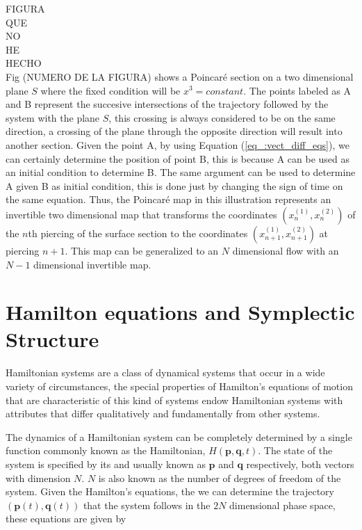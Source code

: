 FIGURA\\
QUE\\
NO\\
HE\\
HECHO\\

Fig (NUMERO DE LA FIGURA) shows a Poincaré section on a two dimensional plane $S$ where the fixed condition will be $x^{3}=constant$. The points labeled as A and B represent the succesive intersections of the trajectory followed by the system with the plane $S$, this crossing is always considered to be on the same direction, a crossing of the plane through the opposite direction will result into another section. Given the point A, by using Equation (\ref{eq_:vect_diff_eqs}), we can certainly determine the position of point B, this is because A can be used as an initial condition to determine B. The same argument can be used to determine A given B as initial condition, this is done just by changing the sign of time on the same equation. Thus, the Poincar\'e map in this illustration represents an invertible two dimensional map that transforms the coordinates $(x_n^{(1)},x_n^{(2)})$ of the $n$th piercing of the surface section to the coordinates $(x_{n+1}^{(1)},x_{n+1}^{(2)})$ at piercing $n+1$. This map can be generalized to an $N$ dimensional flow with an $N-1$ dimensional invertible map.

\section{Hamilton equations and Symplectic Structure}

Hamiltonian systems are a class of dynamical systems that occur in a wide variety of circumstances, the special properties of Hamilton's equations of motion that are characteristic of this kind of systems endow Hamiltonian systems with attributes that differ qualitatively and fundamentally from other systems.\par 

The dynamics of a Hamiltonian system can be completely determined by a single function commonly known as the Hamiltonian, $H(\bm{p},\bm{q},t)$. The state of the system is specified by its  and  usually known as $\bm{p}$ and $\bm{q}$ respectively, both vectors with dimension $N$. $N$ is also known as the number of degrees of freedom of the system. Given the Hamilton's equations, the we can determine the trajectory  $(\bm{p}(t),\bm{q}(t))$ that the system follows in the $2N$ dimensional phase space, these equations are given by


